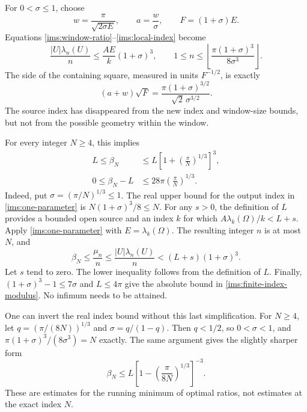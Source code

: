 \documentclass[11pt,reqno]{amsart}
\numberwithin{equation}{section}
\newcommand{\abs}[1]{\lvert#1\rvert}
\newcommand{\Om}{\Omega}
\begin{document}
For $0<\sigma\leq1$, choose
\[
 w=\frac{\pi}{\sqrt{2\sigma E}},\qquad
 a=\frac w\sigma,\qquad F=(1+\sigma)E.
\]
Equations \eqref{ims:window-ratio}--\eqref{ims:local-index} become
\begin{equation}
 \frac{\abs U\lambda_n(U)}n
       \leq\frac{A E}{k}(1+\sigma)^3,
 \qquad
 1\leq n\leq
 \left\lfloor\frac{\pi(1+\sigma)^3}{8\sigma^3}\right\rfloor.
 \label{ims:one-parameter}
\end{equation}
The side of the containing square, measured in units $F^{-1/2}$,
is exactly
\begin{equation}
 (a+w)\sqrt F
   =\frac{\pi(1+\sigma)^{3/2}}{\sqrt2\,\sigma^{3/2}}.
 \label{ims:window-size}
\end{equation}
The source index has disappeared from the new index and window-size
bounds, but not from the possible geometry within the window.

For every integer $N\geq4$, this implies
\begin{equation}
 \begin{split}
 L\leq\beta_N
   &\leq L\left[1+\left(\frac\pi N\right)^{1/3}\right]^3,\\
 0\leq\beta_N-L
   &\leq28\pi\left(\frac\pi N\right)^{1/3}.
 \end{split}
 \label{ims:finite-index-modulus}
\end{equation}
Indeed, put $\sigma=(\pi/N)^{1/3}\leq1$.  The real upper bound
for the output index in \eqref{ims:one-parameter} is
$N(1+\sigma)^3/8\leq N$.  For any $s>0$, the definition of $L$
provides a bounded open source and an index $k$ for which
$A\lambda_k(\Om)/k<L+s$.  Apply \eqref{ims:one-parameter} with
$E=\lambda_k(\Om)$.  The resulting integer $n$ is at most $N$,
and
\[
 \beta_N\leq\frac{\mu_n}{n}
       \leq\frac{\abs U\lambda_n(U)}n
       <(L+s)(1+\sigma)^3.
\]
Let $s$ tend to zero.  The lower inequality follows from the
definition of $L$.  Finally,
$(1+\sigma)^3-1\leq7\sigma$ and $L\leq4\pi$ give the absolute
bound in \eqref{ims:finite-index-modulus}.  No infimum needs to
be attained.

One can invert the real index bound without this last simplification.
For $N\geq4$, let $q=(\pi/(8N))^{1/3}$ and
$\sigma=q/(1-q)$.  Then $q<1/2$, so $0<\sigma<1$, and
$\pi(1+\sigma)^3/(8\sigma^3)=N$ exactly.  The same argument gives
the slightly sharper form
\begin{equation}
 \beta_N\leq L\left[1-\left(\frac{\pi}{8N}\right)^{1/3}\right]^{-3}.
 \label{ims:inverted-modulus}
\end{equation}
These are estimates for the running minimum of optimal ratios, not
estimates at the exact index $N$.
\end{document}
